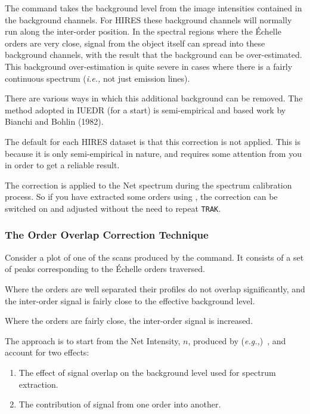 The 
 command takes the background level from the image intensities
contained in the background channels.  For HIRES these background channels
will normally run along the inter-order position.  In the spectral regions
where the \'{E}chelle orders are very close, signal from the object itself can
spread into these background channels, with the result that the background
can be over-estimated.  This background over-estimation is quite severe in
cases where there is a fairly continuous spectrum ({\it{i.e.,}}  not just
emission lines)\@.

There are various ways in which this additional background can be removed.
The method adopted in IUEDR (for a start) is semi-empirical and based work by
Bianchi and Bohlin (1982)\@.

The default for each HIRES dataset is that this correction is not applied.
This is because it is only semi-empirical in nature, and requires some
attention from you in order to get a reliable result.

The correction is applied to the Net spectrum during the spectrum calibration
process.  So if you have extracted some orders using
, the correction can be switched on and
adjusted without the need to repeat \verb+TRAK+\@.

\subsubsection{The Order Overlap Correction Technique}

Consider a plot of one of the scans produced by the
 command.  It
consists of a set of peaks corresponding to the \'{E}chelle orders traversed.

Where the orders are well separated their profiles do not overlap
significantly, and the inter-order signal is fairly close to the
effective background level.

Where the orders are fairly close, the inter-order signal is increased.

The approach is to start from the Net Intensity, $n$, produced by
({\it{e.g.,}})\ , and account for two effects:

\begin{enumerate}

\item The effect of signal overlap on the background level used for
      spectrum extraction.

\item The contribution of signal from one order into another.

\end{enumerate}

